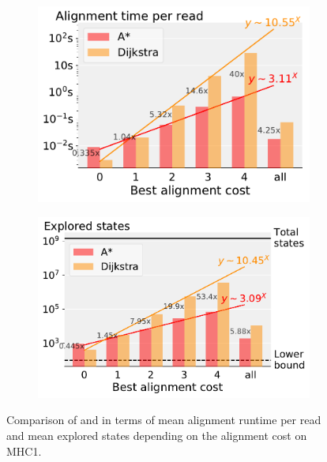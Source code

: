 \begin{figure}[t]
  \begin{subfigure}{.45\textwidth}
    \centering
    \includegraphics[width=\linewidth]{figs/cmp/heuristic_MHC1_cost-t(map).pdf}
  \end{subfigure}%
  \begin{subfigure}{.45\textwidth}
    \centering
    \includegraphics[width=\linewidth]{figs/cmp/heuristic_MHC1_cost-explored_states.pdf}
  \end{subfigure}%
  \caption[Performance scaling with alignment cost]{Comparison of \A and \dijkstra in terms of mean alignment runtime per read and mean explored states depending on the alignment cost on MHC1.}
  \label{TRIEfig:scaling_with_errors}
\end{figure}